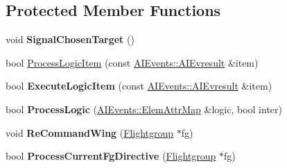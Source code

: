 \subsection*{Protected Member Functions}
\begin{DoxyCompactItemize}
\item 
void {\bfseries Signal\+Chosen\+Target} ()\hypertarget{classOrders_1_1AggressiveAI_aa0710b43eb95c79b231a9cf195b930a4}{}\label{classOrders_1_1AggressiveAI_aa0710b43eb95c79b231a9cf195b930a4}

\item 
bool \hyperlink{classOrders_1_1AggressiveAI_a0fddb46fa2da2e53ef0472cf5e392f24}{Process\+Logic\+Item} (const \hyperlink{structAIEvents_1_1AIEvresult}{A\+I\+Events\+::\+A\+I\+Evresult} \&item)
\item 
bool {\bfseries Execute\+Logic\+Item} (const \hyperlink{structAIEvents_1_1AIEvresult}{A\+I\+Events\+::\+A\+I\+Evresult} \&item)\hypertarget{classOrders_1_1AggressiveAI_a70a20372cb6b5d2c1b5782f0b528c5cd}{}\label{classOrders_1_1AggressiveAI_a70a20372cb6b5d2c1b5782f0b528c5cd}

\item 
bool {\bfseries Process\+Logic} (\hyperlink{structAIEvents_1_1ElemAttrMap}{A\+I\+Events\+::\+Elem\+Attr\+Map} \&logic, bool inter)\hypertarget{classOrders_1_1AggressiveAI_aa0ec8ba257f1616c8e382c17c6e1ede9}{}\label{classOrders_1_1AggressiveAI_aa0ec8ba257f1616c8e382c17c6e1ede9}

\item 
void {\bfseries Re\+Command\+Wing} (\hyperlink{classFlightgroup}{Flightgroup} $\ast$fg)\hypertarget{classOrders_1_1AggressiveAI_aa937c06031fbc61a3a3d49d42b81fb46}{}\label{classOrders_1_1AggressiveAI_aa937c06031fbc61a3a3d49d42b81fb46}

\item 
bool {\bfseries Process\+Current\+Fg\+Directive} (\hyperlink{classFlightgroup}{Flightgroup} $\ast$fg)\hypertarget{classOrders_1_1AggressiveAI_a239ddbd5da6000110858abff9ba68919}{}\label{classOrders_1_1AggressiveAI_a239ddbd5da6000110858abff9ba68919}

\end{DoxyCompactItemize}
